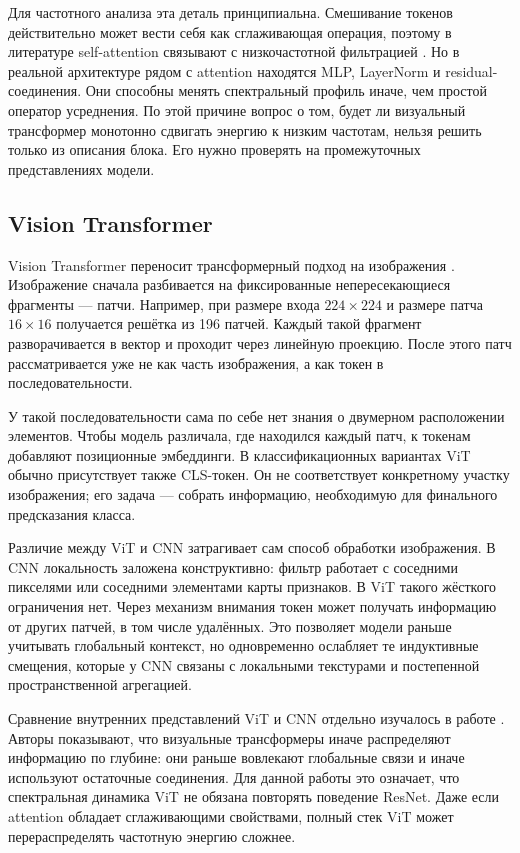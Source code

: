 Для частотного анализа эта деталь принципиальна. Смешивание токенов действительно может вести себя как сглаживающая операция, поэтому в литературе self-attention связывают с низкочастотной фильтрацией \cite{park2022how}. Но в реальной архитектуре рядом с attention находятся MLP, LayerNorm и residual-соединения. Они способны менять спектральный профиль иначе, чем простой оператор усреднения. По этой причине вопрос о том, будет ли визуальный трансформер монотонно сдвигать энергию к низким частотам, нельзя решить только из описания блока. Его нужно проверять на промежуточных представлениях модели.

\subsection{Vision Transformer}

Vision Transformer переносит трансформерный подход на изображения \cite{dosovitskiy2021image}. Изображение сначала разбивается на фиксированные непересекающиеся фрагменты — патчи. Например, при размере входа $224 \times 224$ и размере патча $16 \times 16$ получается решётка из 196 патчей. Каждый такой фрагмент разворачивается в вектор и проходит через линейную проекцию. После этого патч рассматривается уже не как часть изображения, а как токен в последовательности.

У такой последовательности сама по себе нет знания о двумерном расположении элементов. Чтобы модель различала, где находился каждый патч, к токенам добавляют позиционные эмбеддинги. В классификационных вариантах ViT обычно присутствует также CLS-токен. Он не соответствует конкретному участку изображения; его задача — собрать информацию, необходимую для финального предсказания класса.

Различие между ViT и CNN затрагивает сам способ обработки изображения. В CNN локальность заложена конструктивно: фильтр работает с соседними пикселями или соседними элементами карты признаков. В ViT такого жёсткого ограничения нет. Через механизм внимания токен может получать информацию от других патчей, в том числе удалённых. Это позволяет модели раньше учитывать глобальный контекст, но одновременно ослабляет те индуктивные смещения, которые у CNN связаны с локальными текстурами и постепенной пространственной агрегацией.

Сравнение внутренних представлений ViT и CNN отдельно изучалось в работе \cite{raghu2021do}. Авторы показывают, что визуальные трансформеры иначе распределяют информацию по глубине: они раньше вовлекают глобальные связи и иначе используют остаточные соединения. Для данной работы это означает, что спектральная динамика ViT не обязана повторять поведение ResNet. Даже если attention обладает сглаживающими свойствами, полный стек ViT может перераспределять частотную энергию сложнее.

